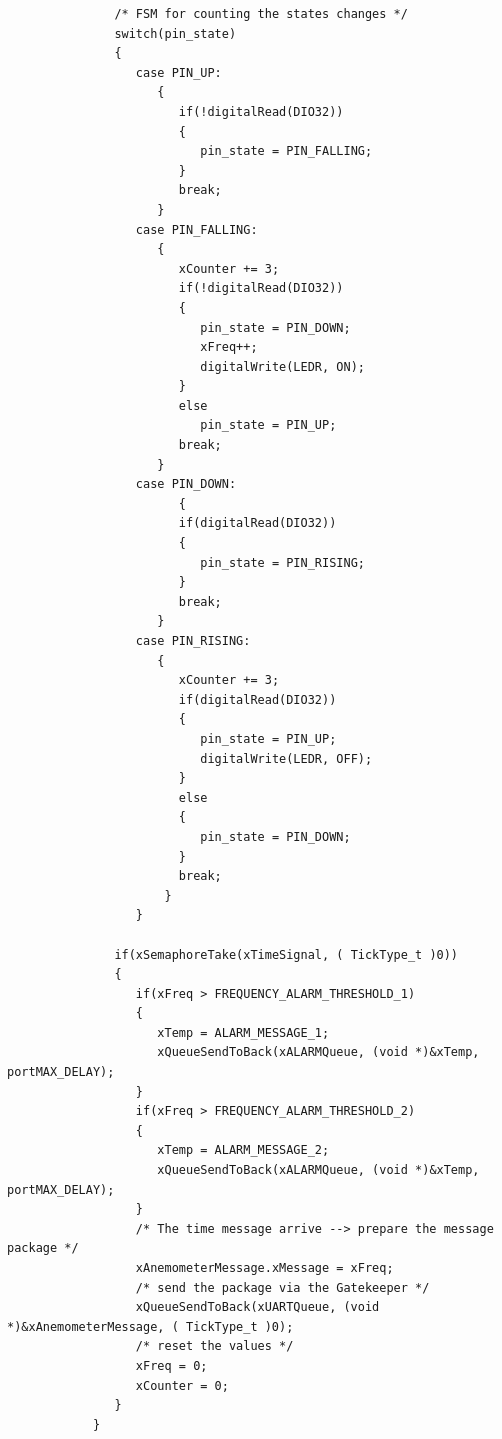 \documentclass[10pt]{article}
\begin{document}
\begin{itemize}
\begin{verbatim}
               /* FSM for counting the states changes */
               switch(pin_state)
               {
                  case PIN_UP:
                     {
                        if(!digitalRead(DIO32))
                        {
                           pin_state = PIN_FALLING;
                        }
                        break;
                     }
                  case PIN_FALLING:
                     {
                        xCounter += 3;
                        if(!digitalRead(DIO32))
                        {
                           pin_state = PIN_DOWN;
                           xFreq++;
                           digitalWrite(LEDR, ON);
                        }
                        else
                           pin_state = PIN_UP;
                        break;
                     }
                  case PIN_DOWN:
                        {
                        if(digitalRead(DIO32))
                        {
                           pin_state = PIN_RISING;
                        }
                        break;
                     }
                  case PIN_RISING:
                     {
                        xCounter += 3;
                        if(digitalRead(DIO32))
                        {
                           pin_state = PIN_UP;
                           digitalWrite(LEDR, OFF);
                        }
                        else
                        {
                           pin_state = PIN_DOWN;
                        }
                        break;
                      }
                  }

               if(xSemaphoreTake(xTimeSignal, ( TickType_t )0))
               {
                  if(xFreq > FREQUENCY_ALARM_THRESHOLD_1)
                  {
                     xTemp = ALARM_MESSAGE_1;
                     xQueueSendToBack(xALARMQueue, (void *)&xTemp, portMAX_DELAY);
                  }
                  if(xFreq > FREQUENCY_ALARM_THRESHOLD_2)
                  {
                     xTemp = ALARM_MESSAGE_2;
                     xQueueSendToBack(xALARMQueue, (void *)&xTemp, portMAX_DELAY);
                  }
                  /* The time message arrive --> prepare the message package */
                  xAnemometerMessage.xMessage = xFreq;
                  /* send the package via the Gatekeeper */
                  xQueueSendToBack(xUARTQueue, (void *)&xAnemometerMessage, ( TickType_t )0);
                  /* reset the values */
                  xFreq = 0;
                  xCounter = 0;
               }
            }


\end{verbatim}
\end{itemize}
\end{document}
